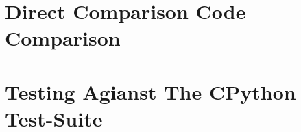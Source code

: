 \documentclass{l4proj}
\begin{document}
\section{Direct Comparison Code Comparison}

\section{Testing Agianst The CPython Test-Suite}




\end{document}

